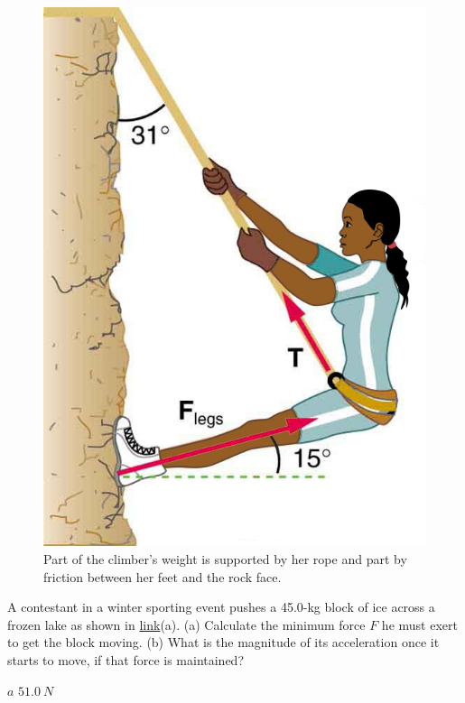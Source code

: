 \documentclass[
]{book}
\begin{document}
\begin{figure}
\hypertarget{fs-id1165296580243}{%
\centering
\includegraphics{images/Figure_06_01_06.jpg}
\caption{Part of the climber's weight is supported by her rope and part by
friction between her feet and the rock
face.}\label{fs-id1165296580243}
}
\end{figure}

\hypertarget{fs-id1531145}{}
\leavevmode{}%
A contestant in a winter sporting event pushes a 45.0-kg block of ice
across a frozen lake as shown in
\protect\hyperlink{import-auto-id1165298619770}{link}(a). (a)
Calculate the minimum force \(F\) he must exert to get the block moving.
(b) What is the magnitude of its acceleration once it starts to move, if
that force is maintained?

\leavevmode{}%
\(a\) \({\text{51}\text{.}0\ N}{}\)
\end{document}
